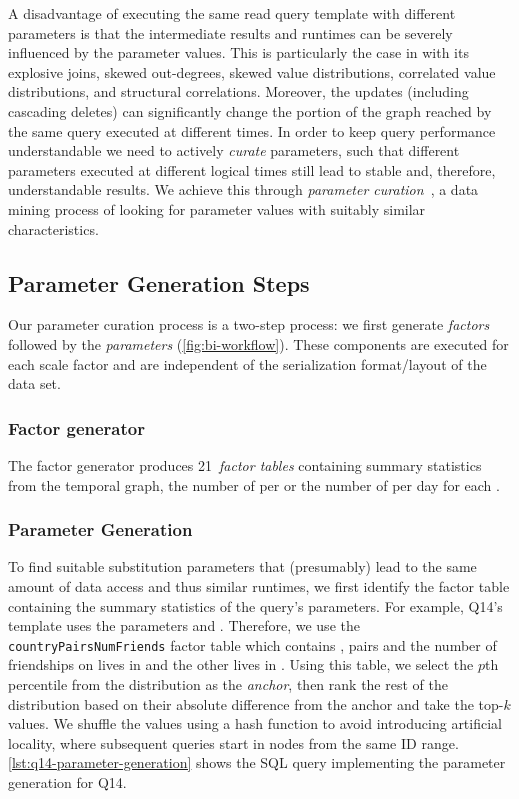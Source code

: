A disadvantage of executing the same read query template with different parameters is that the intermediate results and runtimes can be severely influenced by the parameter values.
This is particularly the case in \snbbi with its explosive joins, skewed out-degrees, skewed value distributions, correlated value distributions, and structural correlations.
Moreover, the updates (including cascading deletes) can significantly change the portion of the graph reached by the same query executed at different times. %
In order to keep query performance understandable we need to actively {\em curate} parameters, such that different parameters executed at different logical times %
still lead to stable and, therefore, understandable results.
We achieve this through \emph{parameter curation}~\cite{DBLP:conf/tpctc/GubichevB14,DBLP:conf/sigmod/ErlingALCGPPB15}, a data mining process of looking for parameter values with suitably similar characteristics.

\subsection{Parameter Generation Steps}
\label{sec:parameter-curation-method}

Our parameter curation process is a two-step process:
we first generate \emph{factors} followed by the \emph{parameters} (\autoref{fig:bi-workflow}).
These components are executed for each scale factor and are independent of the serialization format/layout of the data set.

\subsubsection*{Factor generator}
The factor generator produces 21~\emph{factor tables} containing summary statistics from the temporal graph,
\eg
the number of \tPersons per \tCity
or
the number of \tMessages per day for each \tTag.


\subsubsection*{Parameter Generation}
\label{sec:parameter-generation-query}

To find suitable substitution parameters that (presumably) lead to the same amount of data access and thus similar runtimes,
we first identify the factor table containing the summary statistics of the query's parameters.
For example, Q14's template uses the parameters \tCountry {} and \tCountry {}.
Therefore, we use the \texttt{countryPairsNumFriends} factor table which contains ,  pairs and the number of friendships on \tPerson lives in  and the other lives in .
Using this table, we select the $p$th percentile from the distribution as the \emph{anchor},
then rank the rest of the distribution based on their absolute difference from the anchor and take the top-$k$ values.
We shuffle the values using a hash function to avoid introducing artificial locality, where \eg subsequent queries start in nodes from the same ID range.
\autoref{lst:q14-parameter-generation} shows the SQL query implementing the parameter generation for Q14\variantA.

